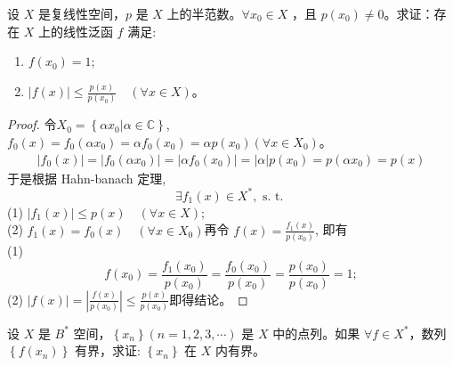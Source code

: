 \documentclass[lang=cn,newtx,10pt,scheme=chinese,thmcnt=chapter]{elegantbook}
\begin{document}
\begin{problem}
设 ${X}$ 是复线性空间，$p$ 是 ${X}$ 上的半范数。$\forall x_0 \in {X}$ ，且 $p\left(x_0\right) \neq 0$。求证：存在 ${X}$ 上的线性泛函 $f$ 满足:
\begin{enumerate}
    \item $f\left(x_0\right)=1$;
    \item $|f(x)| \leqslant \frac{p(x)}{p\left(x_0\right)} \quad (\forall x \in {X})$。
\end{enumerate}
\end{problem}
\begin{proof}
令${X}_0=\left\{\alpha x_0|\alpha\in\mathbb{C}\right\}$,$f_0(x)=f_0\left(\alpha x_0\right)=\alpha f_0\left(x_0\right)=\alpha p\left(x_0\right)(\forall x\in{X}_0)$。\\
\begin{equation*}
\begin{aligned}
 \left|f_0(x)\right|=\left|f_0\left(\alpha x_0\right)\right|=\left|\alpha f_0\left(x_0\right)\right|=|\alpha| p\left(x_0\right) 
 =p\left(\alpha x_0\right)=p(x)
\end{aligned}
\end{equation*}
于是根据 Hahn-banach 定理,
\begin{equation*}
\exists f_1(x) \in {X}^*, \text { s. t. }
\end{equation*}
(1) $\left|f_1(x)\right| \leqslant p(x) \quad(\forall x \in {X})$;\\
(2) $f_1(x)=f_0(x) \quad\left(\forall x \in {X}_0\right)$再令 $f(x)=\frac{f_1(x)}{p\left(x_0\right)}$, 即有\\
(1)
\begin{equation*}
f\left(x_0\right)=\frac{f_1\left(x_0\right)}{p\left(x_0\right)}=\frac{f_0\left(x_0\right)}{p\left(x_0\right)}=\frac{p\left(x_0\right)}{p\left(x_0\right)}=1 ;
\end{equation*}
(2) $|f(x)|=\left|\frac{f(x)}{p\left(x_0\right)}\right| \leqslant \frac{p(x)}{p\left(x_0\right)}$即得结论。
\end{proof}
\begin{problem}
设 ${X}$ 是 $B^*$ 空间，$\left\{x_n\right\}(n=1,2,3, \cdots)$ 是 ${X}$ 中的点列。如果 $\forall f \in {X}^*$，数列 $\left\{f\left(x_n\right)\right\}$ 有界，求证: $\left\{x_n\right\}$ 在 ${X}$ 内有界。
\end{problem}
\end{document}

